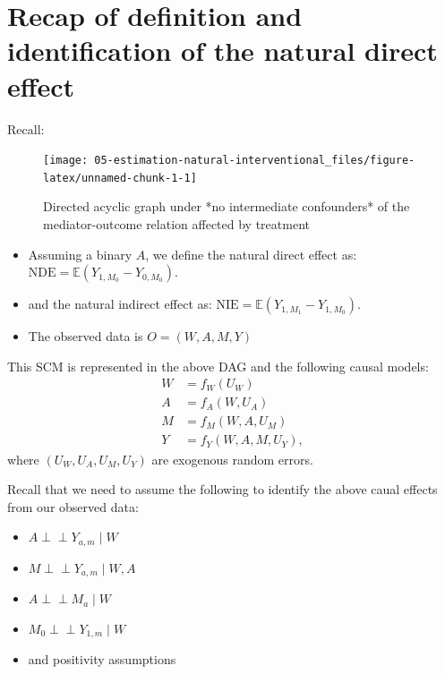 \documentclass[
  12pt,
]{book}
\providecommand{\tightlist}{%
  \setlength{\itemsep}{0pt}\setlength{\parskip}{0pt}}
\theoremstyle{definition}
\theoremstyle{definition}
\theoremstyle{definition}
\newcommand{\indep}{\mbox{$\perp\!\!\!\perp$}}
\newcommand{\E}{\mathbb{E}}
\newcommand{\1}{\mathbbm{1}}
\begin{document}
\hypertarget{recap-of-definition-and-identification-of-the-natural-direct-effect}{%
\section{Recap of definition and identification of the natural direct effect}\label{recap-of-definition-and-identification-of-the-natural-direct-effect}}

Recall:

\begin{figure}

{\centering \texttt{[image: 05-estimation-natural-interventional\_files/figure-latex/unnamed-chunk-1-1]} 

}

\caption{Directed acyclic graph under *no intermediate confounders* of the mediator-outcome relation affected by treatment}\label{fig:unnamed-chunk-1}
\end{figure}

\begin{itemize}
\tightlist
\item
  Assuming a binary \(A\), we define the natural direct effect as:
  \(\text{NDE} = \E(Y_{1,M_{0}} - Y_{0,M_{0}})\).
\item
  and the natural indirect effect as:
  \(\text{NIE} = \E(Y_{1,M_{1}} - Y_{1,M_{0}})\).
\item
  The observed data is \(O = (W, A, M, Y)\)
\end{itemize}

This SCM is represented in the above DAG and the following causal models:
\begin{align*}
  W & = f_W(U_W) \\
  A & = f_A(W, U_A) \\
  M & = f_M(W, A, U_M) \\
  Y & = f_Y(W, A, M, U_Y),
\end{align*}
where \((U_W, U_A,U_M, U_Y)\) are exogenous random errors.

Recall that we need to assume the following to identify the above caual effects
from our observed data:

\begin{itemize}
\tightlist
\item
  \(A \indep Y_{a,m} \mid W\)
\item
  \(M \indep Y_{a,m} \mid W, A\)
\item
  \(A \indep M_a \mid W\)
\item
  \(M_0 \indep Y_{1,m} \mid W\)
\item
  and positivity assumptions
\end{itemize}
\end{document}
